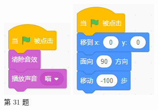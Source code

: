 \documentclass[10pt, a4paper]{article}
\begin{document}
\begin{enumerate}
        \begin{figure}[htbp]
            \centering
            \begin{minipage}[t]{.15\textwidth}
                \centering
                \includegraphics[width=\textwidth]{31.png}
                \caption*{第 31 题}
            \end{minipage}
            \begin{minipage}[t]{.15\textwidth}
                \centering
                \includegraphics[width=\textwidth]{33.png}

\end{minipage}
\end{figure}
\end{enumerate}
\end{document}
